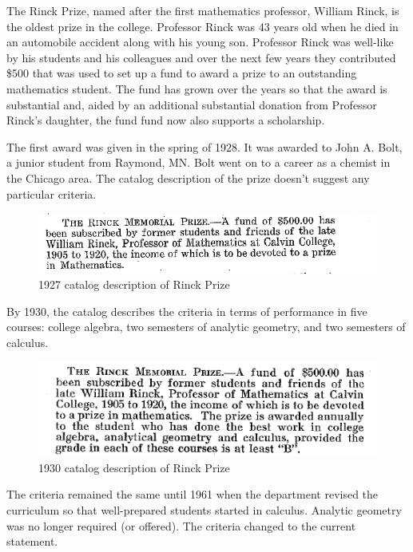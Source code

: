 \documentclass[
]{book}
\begin{document}
The Rinck Prize, named after the first mathematics professor, William Rinck, is the oldest prize in the college. Professor Rinck was 43 years old when he died in an automobile accident along with his young son. Professor Rinck was well-like by his students and his colleagues and over the next few years they contributed \$500 that was used to set up a fund to award a prize to an outstanding mathematics student. The fund has grown over the years so that the award is substantial and, aided by an additional substantial donation from Professor Rinck's daughter, the fund fund now also supports a scholarship.

The first award was given in the spring of 1928. It was awarded to John A. Bolt, a junior student from Raymond, MN. Bolt went on to a career as a chemist in the Chicago area. The catalog description of the prize doesn't suggest any particular criteria.

\begin{figure}

{\centering \includegraphics[width=0.7\linewidth]{images/Rinck1927} 

}

\caption{1927 catalog description of Rinck Prize}\label{fig:Rinck}
\end{figure}

By 1930, the catalog describes the criteria in terms of performance in five courses: college algebra, two semesters of analytic geometry, and two semesters of calculus.

\begin{figure}

{\centering \includegraphics[width=0.7\linewidth]{images/Rinck1930} 

}

\caption{1930 catalog description of Rinck Prize}\label{fig:Rinck30}
\end{figure}

The criteria remained the same until 1961 when the department revised the curriculum so that well-prepared students started in calculus. Analytic geometry was no longer required (or offered). The criteria changed to the current statement.
\end{document}
